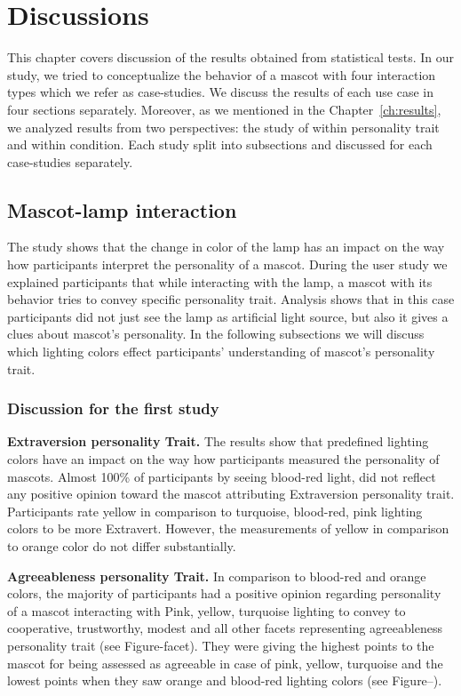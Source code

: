 \chapter{Discussions}
\label{ch:discussions}
This chapter covers discussion of the results obtained from statistical tests.
In our study, we tried to conceptualize the behavior of a mascot with four interaction types which we refer as case-studies.
We discuss the results of each use case in four sections separately.
Moreover, as we mentioned in the Chapter~\ref{ch:results}, we analyzed results from two perspectives: the study of
within personality trait and within condition.
Each study split into subsections and discussed for each case-studies separately.

\section{Mascot-lamp interaction}
\label{sec:mascot-lamp-interaction}
The study shows that the change in color of the lamp has an impact on the way
how participants interpret the personality of a mascot.
During the user study we explained participants that while interacting with the lamp,
a mascot with its behavior tries to convey specific personality trait.
Analysis shows that in this case participants did not just see the lamp as artificial light source,
but also it gives a clues about mascot's personality.
In the following subsections we will discuss which lighting colors effect participants' understanding
of mascot's personality trait.

\subsection{Discussion for the first study}
\label{subsec:discussion-for-the-first-study}

\par\textbf{Extraversion personality Trait.}
The results show that predefined lighting colors have an impact on the
way how participants measured the personality of mascots.
Almost 100\% of participants by seeing blood-red light, did not reflect any positive opinion toward the mascot
attributing Extraversion personality trait.
Participants rate yellow in comparison to turquoise, blood-red, pink lighting colors to be more Extravert.
However, the measurements of yellow in comparison to orange color do not differ substantially.

\par\textbf{Agreeableness personality Trait.}
In comparison to blood-red and orange colors, the majority of participants had a positive opinion
regarding personality of a mascot interacting with Pink, yellow, turquoise lighting to convey to cooperative,
trustworthy, modest and all other facets representing agreeableness personality trait (see Figure-facet).
They were giving the highest points to the mascot for being assessed as agreeable
in case of pink, yellow, turquoise and the lowest points when they saw orange and blood-red
lighting colors (see Figure--).

